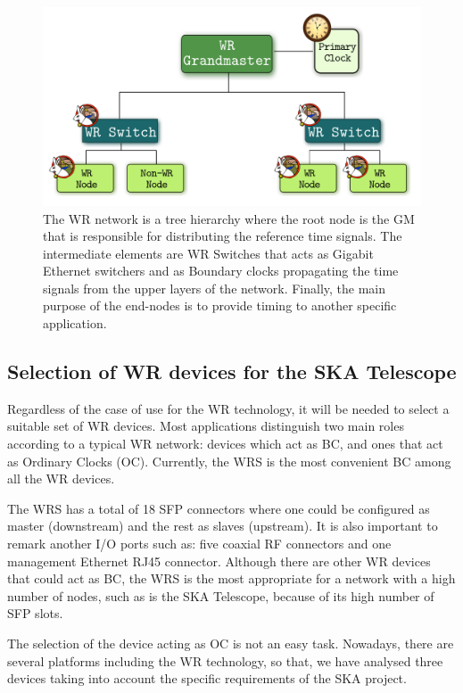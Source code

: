 \begin{figure}[H] \centering \includegraphics[scale=0.4]{img/wr_hierarchy}
	\caption{The WR network is a tree hierarchy where the root node is the
	GM that is responsible for distributing the reference time signals. The
	intermediate elements are WR Switches that acts as Gigabit Ethernet
	switchers and as Boundary clocks propagating the time signals from the
	upper layers of the network. Finally, the main purpose of the end-nodes
	is to provide timing to another specific application.}
\label{fig:wr_hierarchy} \end{figure}

\subsection{Selection of WR devices for the SKA Telescope} \label{subsec:wr-dev}

Regardless of the case of use for the WR technology, it will be needed to select
a suitable set of WR devices. Most applications distinguish two main roles
according to a typical WR network: devices which act as BC, and ones that act as
Ordinary Clocks (OC). Currently, the WRS \cite{ohwr:wrs} is the most convenient
BC among all the WR devices. 

The WRS has a total of 18 SFP connectors where one could be configured as master
(downstream) and the rest as slaves (upstream). It is also important to remark
another I/O ports such as: five coaxial RF connectors and one management
Ethernet RJ45 connector. Although there are other WR devices that could act as
BC, the WRS is the most appropriate for a network with a high number of nodes,
such as is the SKA Telescope, because of its high number of SFP slots.

The selection of the device acting as OC is not an easy task. Nowadays, there
are several platforms including the WR technology, so that, we have analysed
three devices taking into account the specific requirements of the SKA project.

